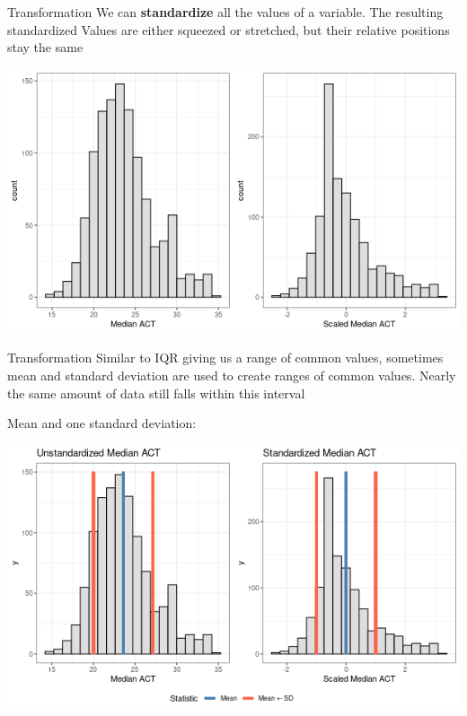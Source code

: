 \documentclass{beamer}
\begin{document}
\begin{frame}{Transformation}
\footnotesize
We can \textbf{standardize} all the values of a variable. The resulting standardized Values are either squeezed or stretched, but their relative positions stay the same

\begin{center}
\includegraphics[scale=0.5]{scaled_act.png}
\end{center}
\end{frame}

\begin{frame}{Transformation}
\footnotesize
Similar to IQR giving us a range of common values, sometimes mean and standard deviation are used to create ranges of common values. Nearly the same amount of data still falls within this interval \vspace{3mm}

Mean and one standard deviation:
\begin{center}
\includegraphics[scale=0.5]{scaled_act2.png}
\end{center}
\end{frame}
\end{document}
